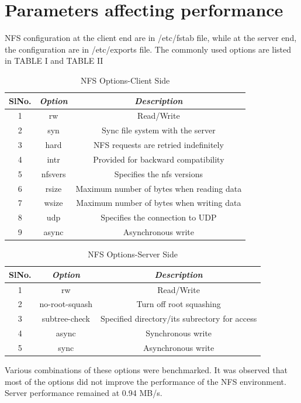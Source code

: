\documentclass[conference]{IEEEtran}
\begin{document}
\section{Parameters affecting performance}
NFS configuration at the client end are in /etc/fstab file, while at the
server end, the configuration are in /etc/exports file. The commonly used
options are listed in TABLE I and TABLE II
\begin{table}[htbp]
\caption{NFS Options-Client Side}
\begin{center}
\begin{tabular}{|c|c|c|}
\hline
\cline{2-3} 
\textbf{SlNo.} & \textbf{\textit{Option}}& \textbf{\textit{Description}} \\
\hline
1& rw & Read/Write  \\
2& syn & Sync file system with the server  \\
3& hard & NFS requests are retried indefinitely  \\
4& intr & Provided for backward compatibility \\
5& nfsvers & Specifies the nfs versions  \\
6& rsize & Maximum number of bytes when reading data  \\
7& wsize & Maximum number of bytes when writing data  \\
8& udp & Specifies the connection to UDP  \\
9& async & Asynchronous write  \\
\hline
\end{tabular}
\label{tab2}
\end{center}
\end{table}
\begin{table}[htbp]
\caption{NFS Options-Server Side}
\begin{center}
\begin{tabular}{|c|c|c|}
\hline
\cline{2-3} 
\textbf{SlNo.} & \textbf{\textit{Option}}& \textbf{\textit{Description}} \\
\hline
1& rw & Read/Write  \\
2& no-root-squash & Turn off root squashing  \\
3& subtree-check & Specified directory/its subrectory for access  \\
4& async & Synchronous write \\
5& sync & Asynchronous write  \\
\hline
\end{tabular}
\label{tab1}
\end{center}
\end{table}
Various combinations of these options were benchmarked. It was observed 
that most of the options did not improve the performance of the NFS
environment. Server performance remained at 0.94 MB/s.
\end{document}
